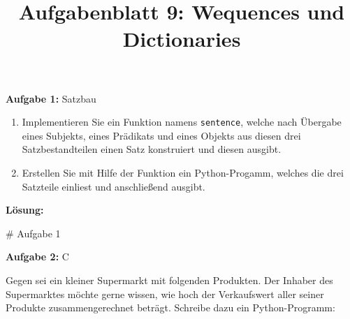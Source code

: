 \documentclass[
  11pt,
  a4paper,
  DIV=11,
  numbers=noendperiod]{scrartcl}
\title{Aufgabenblatt 9: Wequences und Dictionaries}
\author{}
\date{}
\newenvironment{Shaded}{\begin{snugshade}}{\end{snugshade}}
\newcommand{\CommentTok}[1]{\textcolor[rgb]{0.37,0.37,0.37}{#1}}
\begin{document}
\maketitle


\textbf{Aufgabe 1:} Satzbau

\begin{enumerate}
\def\labelenumi{\alph{enumi})}
\item
  Implementieren Sie ein Funktion namens \texttt{sentence}, welche nach
  Übergabe eines Subjekts, eines Prädikats und eines Objekts aus diesen
  drei Satzbestandteilen einen Satz konstruiert und diesen ausgibt.
\item
  Erstellen Sie mit Hilfe der Funktion ein Python-Progamm, welches die
  drei Satzteile einliest und anschließend ausgibt.
\end{enumerate}

\textbf{Lösung:}

\begin{Shaded}
\begin{Highlighting}[numbers=left,,]
\CommentTok{\# Aufgabe 1}
\end{Highlighting}
\end{Shaded}

\textbf{Aufgabe 2:} C

Gegen sei ein kleiner Supermarkt mit folgenden Produkten. Der Inhaber
des Supermarktes möchte gerne wissen, wie hoch der Verkaufswert aller
seiner Produkte zusammengerechnet beträgt. Schreibe dazu ein
Python-Programm:
\end{document}
